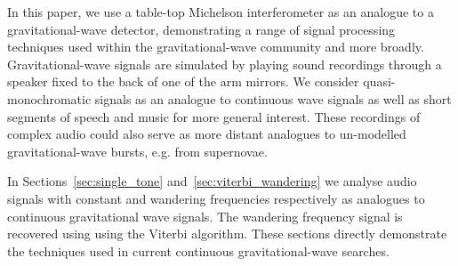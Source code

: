 \documentclass[paper-main.tex]{subfiles}
\begin{document}
In this paper, we use a table-top Michelson interferometer as an analogue to a gravitational-wave detector, demonstrating a range of signal processing techniques used within the gravitational-wave community and more broadly. Gravitational-wave signals are simulated by playing sound recordings through a speaker fixed to the back of one of the arm mirrors. We consider quasi-monochromatic signals as an analogue to continuous wave signals as well as short segments of speech and music for more general interest. These recordings of complex audio could also serve as more distant analogues to un-modelled gravitational-wave bursts, e.g. from supernovae.  

In Sections~\ref{sec:single_tone} and~\ref{sec:viterbi_wandering} we analyse audio signals with constant and wandering frequencies respectively as analogues to continuous gravitational wave signals. 
The wandering frequency signal is recovered using using the Viterbi algorithm. 
These sections directly demonstrate the techniques used in current continuous gravitational-wave searches. 
\end{document}

